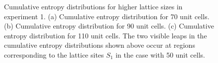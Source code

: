 \documentclass[10pt]{revtex4-1}
\begin{document}
\begin{figure}
\centering
{}
\caption{Cumulative entropy distributions for higher lattice sizes in experiment 1. (a) Cumulative entropy distribution for 70 unit cells. (b) Cumulative entropy distribution for 90 unit cells. (c) Cumulative entropy distribution for 110 unit cells. The two visible leaps in the cumulative entropy distributions shown above occur at regions corresponding to the lattice sites $S_1$ in the case with 50 unit cells.}
\label{cdf1}
\end{figure}
\end{document}

